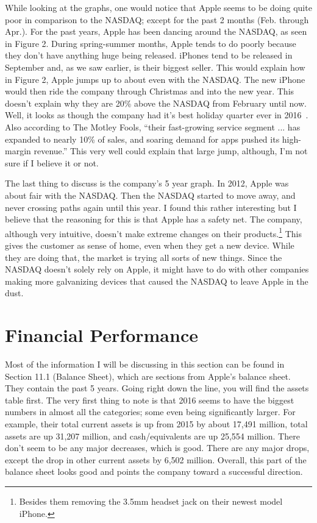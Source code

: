 \documentclass[12pt,a4paper,titlepage]{article}
\begin{document}
While looking at the graphs, one would notice that Apple seems to be doing quite
poor in comparison to the NASDAQ; except for the past 2 months (Feb. through
Apr.). For the past years, Apple has been dancing around the NASDAQ, as seen in
Figure 2. During spring-summer months, Apple tends to do poorly because they
don't have anything huge being released. iPhones tend to be released in
September and, as we saw earlier, is their biggest seller. This would explain
how in Figure 2, Apple jumps up to about even with the NASDAQ. The new iPhone
would then ride the company through Christmas and into the new year. This
doesn't explain why they are 20\% above the NASDAQ from February until
now. Well, it looks as though the company had it's best holiday quarter ever in
2016~\cite{fool}. Also according to The Motley Fools, ``their fast-growing
service segment ... has expanded to nearly 10\% of sales, and soaring demand for
apps pushed its high-margin revenue.'' This very well could explain that large
jump, although, I'm not sure if I believe it or not.

The last thing to discuss is the company's 5 year graph. In 2012, Apple was
about fair with the NASDAQ. Then the NASDAQ started to move away, and never
crossing paths again until this year. I found this rather interesting but I
believe that the reasoning for this is that Apple has a safety net. The company,
although very intuitive, doesn't make extreme changes on their
products.\footnote{Besides them removing the 3.5mm headset jack on their newest
  model iPhone.} This gives the customer as sense of home, even when they get a
new device. While they are doing that, the market is trying all sorts of new
things. Since the NASDAQ doesn't solely rely on Apple, it might have to do with
other companies making more galvanizing devices that caused the NASDAQ to leave
Apple in the dust.

\section{Financial Performance}
Most of the information I will be discussing in this section can be found in
Section 11.1 (Balance Sheet), which are sections from Apple's balance sheet. They
contain the past 5 years. Going right down the line, you will find the assets
table first. The very first thing to note is that 2016 seems to have the biggest
numbers in almost all the categories; some even being significantly larger. For
example, their total current assets is up from 2015 by about 17,491 million,
total assets are up 31,207 million, and cash/equivalents are up 25,554
million. There don't seem to be any major decreases, which is good. There are
any major drops, except the drop in other current assets by 6,502
million. Overall, this part of the balance sheet looks good and points the
company toward a successful direction.
\end{document}
